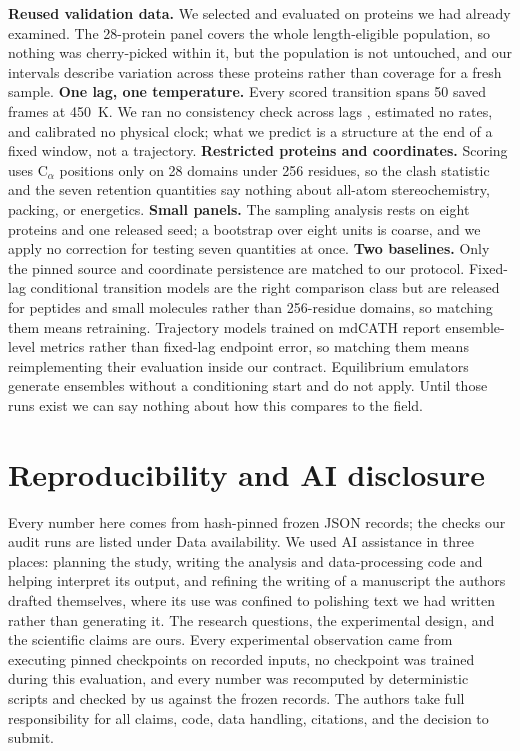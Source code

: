 \documentclass{article}
\newcommand{\CA}{C$_\alpha$}
\begin{document}
\textbf{Reused validation data.} We selected and evaluated on proteins we had already examined. The 28-protein panel covers the whole length-eligible population, so nothing was cherry-picked within it, but the population is not untouched, and our intervals describe variation across these proteins rather than coverage for a fresh sample. \textbf{One lag, one temperature.} Every scored transition spans 50 saved frames at 450~K. We ran no consistency check across lags \citep{schreiner2023ito}, estimated no rates, and calibrated no physical clock; what we predict is a structure at the end of a fixed window, not a trajectory. \textbf{Restricted proteins and coordinates.} Scoring uses \CA{} positions only on 28 domains under 256 residues, so the clash statistic and the seven retention quantities say nothing about all-atom stereochemistry, packing, or energetics. \textbf{Small panels.} The sampling analysis rests on eight proteins and one released seed; a bootstrap over eight units is coarse, and we apply no correction for testing seven quantities at once. \textbf{Two baselines.} Only the pinned source and coordinate persistence are matched to our protocol. Fixed-lag conditional transition models \citep{klein2023timewarp,schreiner2023ito,hsu2024score} are the right comparison class but are released for peptides and small molecules rather than 256-residue domains, so matching them means retraining. Trajectory models trained on mdCATH \citep{shen2025confrover} report ensemble-level metrics rather than fixed-lag endpoint error, so matching them means reimplementing their evaluation inside our contract. Equilibrium emulators \citep{lewis2025bioemu,jing2024alphaflow} generate ensembles without a conditioning start and do not apply. Until those runs exist we can say nothing about how this compares to the field.

\section{Reproducibility and AI disclosure}
\label{sec:repro}

Every number here comes from hash-pinned frozen JSON records; the checks our audit runs are listed under Data availability. We used AI assistance in three places: planning the study, writing the analysis and data-processing code and helping interpret its output, and refining the writing of a manuscript the authors drafted themselves, where its use was confined to polishing text we had written rather than generating it. The research questions, the experimental design, and the scientific claims are ours. Every experimental observation came from executing pinned checkpoints on recorded inputs, no checkpoint was trained during this evaluation, and every number was recomputed by deterministic scripts and checked by us against the frozen records. The authors take full responsibility for all claims, code, data handling, citations, and the decision to submit.
\end{document}
